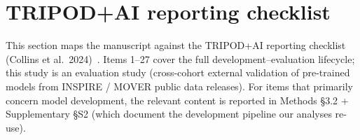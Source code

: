 \documentclass[11pt,a4paper]{article}
\begin{document}
\section{TRIPOD+AI reporting checklist}\label{supp:s8-tripod-checklist}

This section maps the manuscript against the TRIPOD+AI reporting
checklist (Collins et al.~2024)~\cite{Collins2024}. Items 1--27 cover
the full development--evaluation lifecycle; this study is an evaluation
study (cross-cohort external validation of pre-trained models from
INSPIRE / MOVER public data releases). For items that primarily concern
model development, the relevant content is reported in Methods §3.2 +
Supplementary §S2 (which document the development pipeline our analyses
re-use).
\end{document}
